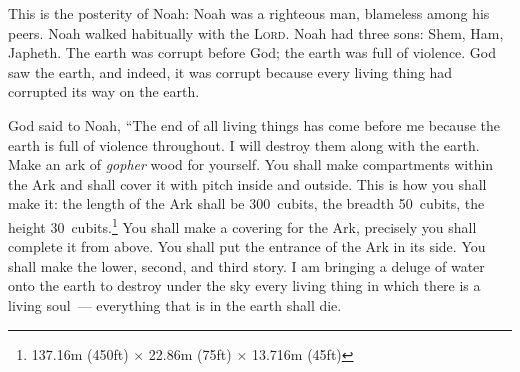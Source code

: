 \begin{inparaenum}
     This is the posterity of Noah: Noah was a righteous man, blameless among his peers. Noah walked habitually with the \textsc{Lord}.%
     Noah had three sons: Shem, Ham, Japheth.%
     The earth was corrupt before God; the earth was full of violence.%
     God saw the earth, and indeed, it was corrupt because every living thing had corrupted its way on the earth.%
    
     God said to Noah, ``The end of all living things has come before me because the earth is full of violence throughout. I will destroy them along with the earth.%
     Make an ark of \textit{gopher} wood for yourself. You shall make compartments within the Ark and shall cover it with pitch inside and outside.%
     This is how you shall make it: the length of the Ark shall be 300~cubits, the breadth 50~cubits, the height 30~cubits.\footnote{137.16\thinspace m (450\thinspace ft) $\times$ 22.86\thinspace m (75\thinspace ft) $\times$ 13.716\thinspace m (45\thinspace ft)}%
     You shall make a covering for the Ark, precisely you shall complete it from above. You shall put the entrance of the Ark in its side. You shall make the lower, second, and third story.\understood%
     I am bringing a deluge of water onto the earth to destroy under the sky every living thing in which there is a living soul~--- everything that is in the earth shall die.%

\end{inparaenum}
